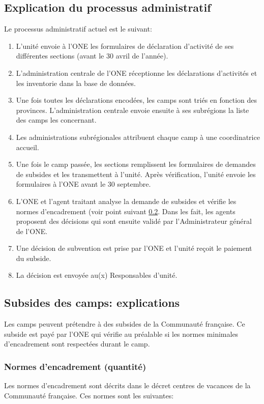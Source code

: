 \subsection{Explication du processus administratif}
Le processus administratif actuel est le suivant: 
\begin{enumerate}
    \item L'unité envoie à l'ONE les formulaires de déclaration d'activité de ses différentes sections (avant le 30 avril de l'année).
    \item L'administration centrale de l'ONE réceptionne les déclarations d'activités et les inventorie dans la base de données. 
    \item Une fois toutes les déclarations encodées, les camps sont triés en fonction des provinces. L'administration centrale envoie ensuite à ses subrégions la liste des camps les concernant.
    \item Les administrations subrégionales attribuent chaque camp à une coordinatrice accueil.
    \item Une fois le camp passée, les sections remplissent les formulaires de demandes de subsides et les transmettent à l'unité. Après vérification, l'unité envoie les formulaires à l'ONE avant le 30 septembre.
    \item L'ONE et l'agent traitant analyse la demande de subsides et vérifie les normes d'encadrement (voir point suivant \ref{subside_camp_explications}. Dans les fait, les agents proposent des décisions qui sont ensuite validé par l'Administrateur général de l'ONE. 
    \item Une décision de subvention est prise par l'ONE et l'unité reçoit le paiement du subside.
    \item La décision est envoyée au(x) Responsables d'unité. 
\end{enumerate}


\subsection{Subsides des camps: explications}\label{subside_camp_explications}
Les camps peuvent prétendre à des subsides de la Communauté française. Ce subside est payé par l'ONE qui vérifie au préalable si les normes minimales d'encadrement sont respectées durant le camp. 

\subsubsection{Normes d'encadrement (quantité)}
Les normes d'encadrement sont décrits dans le décret centres de vacances de la Communauté française. Ces normes sont les suivantes: 

